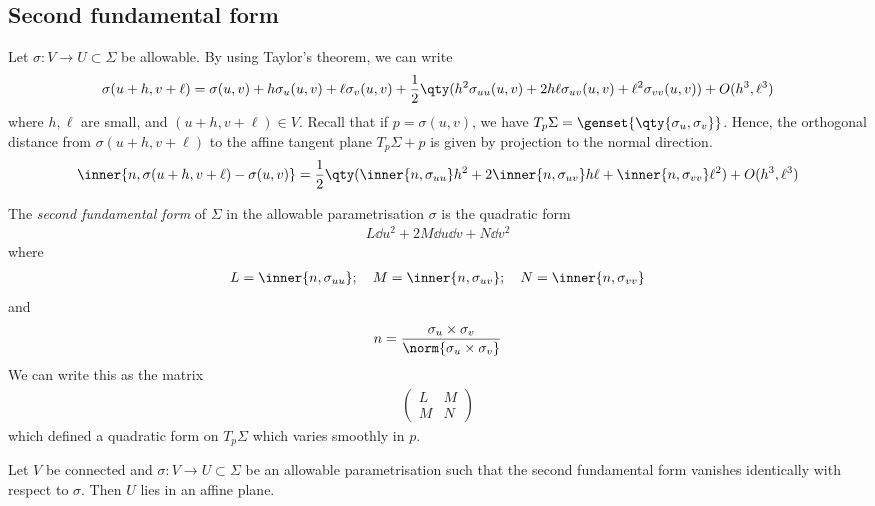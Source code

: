 \subsection{Second fundamental form}
Let $\sigma \colon V \to U \subset \Sigma$ be allowable.
By using Taylor's theorem, we can write
\begin{align*}
	\sigma(u+h,v+\ell) = \sigma(u,v) + h \sigma_u(u,v) + \ell \sigma_v(u,v) + \frac{1}{2} \qty(h^2 \sigma_{uu}(u,v) + 2h\ell \sigma_{uv}(u,v) + \ell^2 \sigma_{vv}(u,v)) + O(h^3,\ell^3)
\end{align*}
where $h,\ell$ are small, and $(u+h,v+\ell) \in V$.
Recall that if $p = \sigma(u,v)$, we have $T_p \Sigma = \genset{\qty{\sigma_u,\sigma_v}}$.
Hence, the orthogonal distance from $\sigma(u+h,v+\ell)$ to the affine tangent plane $T_p \Sigma + p$ is given by projection to the normal direction.
\begin{align*}
	\inner{n,\sigma(u+h,v+\ell) - \sigma(u,v)} = \frac{1}{2} \qty(\inner{n,\sigma_{uu}} h^2 + 2\inner{n,\sigma_{uv}} h\ell + \inner{n,\sigma_{vv}}\ell^2) + O(h^3,\ell^3)
\end{align*}
\begin{definition}
	The \textit{second fundamental form} of $\Sigma$ in the allowable parametrisation $\sigma$ is the quadratic form
	\begin{align*}
		L \dd{u}^2 + 2 M \dd{u} \dd{v} + N \dd{v}^2
	\end{align*}
	where
	\begin{align*}
		L = \inner{n,\sigma_{uu}};\quad M = \inner{n,\sigma_{uv}};\quad N = \inner{n,\sigma_{vv}}
	\end{align*}
	and
	\begin{align*}
		n = \frac{\sigma_u \times \sigma_v}{\norm{\sigma_u \times \sigma_v}}
	\end{align*}
	We can write this as the matrix
	\begin{align*}
		\begin{pmatrix}
			L & M \\
			M & N
		\end{pmatrix}
	\end{align*}
	which defined a quadratic form on $T_p \Sigma$ which varies smoothly in $p$.
\end{definition}
\begin{lemma}
	Let $V$ be connected and $\sigma \colon V \to U \subset \Sigma$ be an allowable parametrisation such that the second fundamental form vanishes identically with respect to $\sigma$.
	Then $U$ lies in an affine plane.
\end{lemma}
